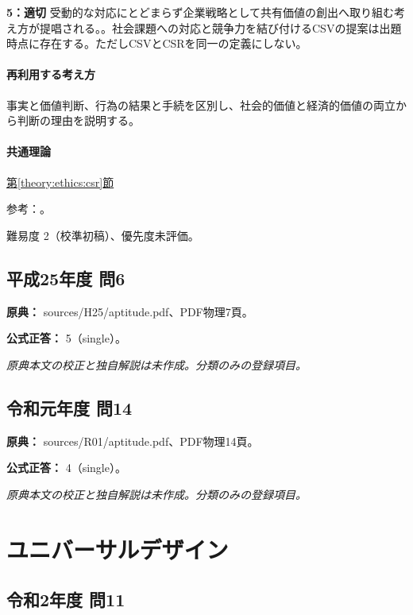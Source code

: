 \noindent\textbf{5：適切} 受動的な対応にとどまらず企業戦略として共有価値の創出へ取り組む考え方が提唱される。。社会課題への対応と競争力を結び付けるCSVの提案は出題時点に存在する。ただしCSVとCSRを同一の定義にしない。\par

\paragraph{再利用する考え方} 事実と価値判断、行為の結果と手続を区別し、社会的価値と経済的価値の両立から判断の理由を説明する。

\paragraph{共通理論} \hyperref[theory:ethics:csr]{第\ref*{theory:ethics:csr}節}

\par 参考：\cite{iso26000,hbs_csv}。

\par 難易度 2（校準初稿）、優先度未評価。

\subsection{平成25年度 問6}
\label{q:h25-reg-apt-06}

\noindent\textbf{原典：} sources/H25/aptitude.pdf、PDF物理7頁。

\textbf{公式正答：} 5（single）。

\par\textit{原典本文の校正と独自解説は未作成。分類のみの登録項目。}

\subsection{令和元年度 問14}
\label{q:r01-reg-apt-14}

\noindent\textbf{原典：} sources/R01/aptitude.pdf、PDF物理14頁。

\textbf{公式正答：} 4（single）。

\par\textit{原典本文の校正と独自解説は未作成。分類のみの登録項目。}

\section{ユニバーサルデザイン}

\subsection{令和2年度 問11}
\label{q:r02-reg-apt-11}

